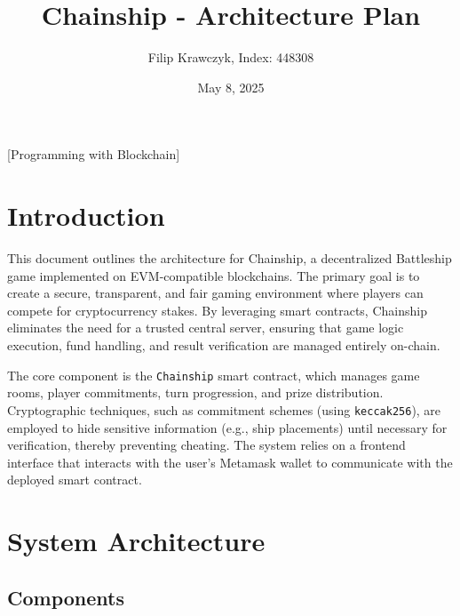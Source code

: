 \documentclass{article}
\begin{document}
    \title{Chainship - Architecture Plan}
    \author{Filip Krawczyk, Index: 448308}
    \date{May 8, 2025}
    \maketitle
    \begin{center}
    \large [Programming with Blockchain]
    \end{center}
    \vspace{1cm}

    \section{Introduction}

    This document outlines the architecture for Chainship, a decentralized Battleship game implemented on EVM-compatible blockchains. The primary goal is to create a secure, transparent, and fair gaming environment where players can compete for cryptocurrency stakes. By leveraging smart contracts, Chainship eliminates the need for a trusted central server, ensuring that game logic execution, fund handling, and result verification are managed entirely on-chain.

    The core component is the \texttt{Chainship} smart contract, which manages game rooms, player commitments, turn progression, and prize distribution. Cryptographic techniques, such as commitment schemes (using \texttt{keccak256}), are employed to hide sensitive information (e.g., ship placements) until necessary for verification, thereby preventing cheating. The system relies on a frontend interface that interacts with the user's Metamask wallet to communicate with the deployed smart contract.

    \section{System Architecture}

    \subsection{Components}
\end{document}

